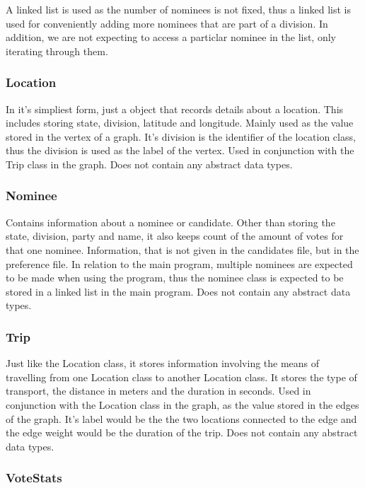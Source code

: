 \documentclass[a4paper, 12pt, titlepage]{article}
\begin{document}
A linked list is used as the number of nominees is not fixed, thus a linked
list is used for conveniently adding more nominees that are part of a division.
In addition, we are not expecting to access a particlar nominee in the list,
only iterating through them.

\subsubsection{Location}

In it's simpliest form, just a object that records details about a location.
This includes storing state, division, latitude and longitude. Mainly used
as the value stored in the vertex of a graph. It's division is the identifier
of the location class, thus the division is used as the label of the vertex.
Used in conjunction with the Trip class in the graph. Does not contain any
abstract data types.

\subsubsection{Nominee}

Contains information about a nominee or candidate. Other than storing the
state, division, party and name, it also keeps count of the amount of votes
for that one nominee. Information, that is not given in the candidates file,
but in the preference file. In relation to the main program, multiple nominees
are expected to be made when using the program, thus the nominee class is
expected to be stored in a linked list in the main program. Does not contain
any abstract data types.

\subsubsection{Trip}

Just like the Location class, it stores information involving the means of
travelling from one Location class to another Location class. It stores
the type of transport, the distance in meters and the duration in seconds.
Used in conjunction with the Location class in the graph, as the value
stored in the edges of the graph. It's label would be the the two locations
connected to the edge and the edge weight would be the duration of the trip.
Does not contain any abstract data types.

\subsubsection{VoteStats}
\end{document}
